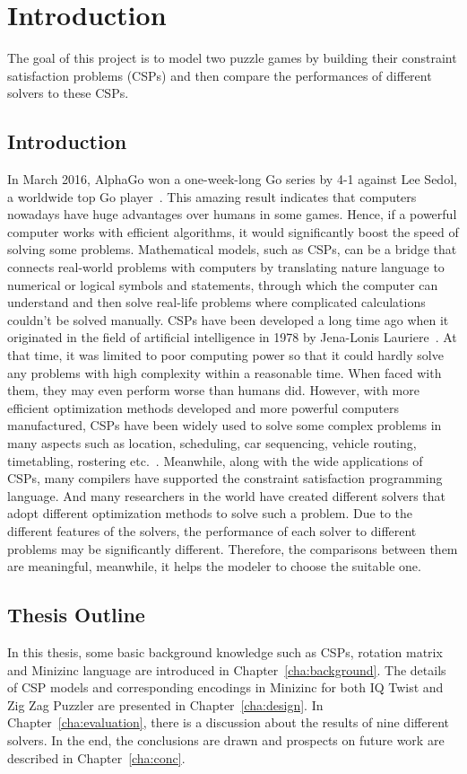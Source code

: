 \chapter{Introduction}
\label{cha:intro}
The goal of this project is to model two puzzle games by building their constraint satisfaction problems (CSPs) and then compare the performances of different solvers to these CSPs.
\section{Introduction}
\label{sec:introduction}
In March 2016, AlphaGo won a one-week-long Go series by 4-1 against Lee Sedol, a worldwide top Go player~\cite{r26}. This amazing result indicates that computers nowadays have huge advantages over humans in some games. Hence, if a powerful computer works with efficient algorithms, it would significantly boost the speed of solving some problems. Mathematical models, such as CSPs, can be a bridge that connects real-world problems with computers by translating nature language to numerical or logical symbols and statements, through which the computer can understand and then solve real-life problems where complicated calculations couldn’t be solved manually. CSPs have been developed a long time ago when it originated in the field of artificial intelligence in 1978 by Jena-Lonis Lauriere~\cite{r27}. At that time, it was limited to poor computing power so that it could hardly solve any problems with high complexity within a reasonable time. When faced with them, they may even perform worse than humans did. However, with more efficient optimization methods developed and more powerful computers manufactured, CSPs have been widely used to solve some complex problems in many aspects such as location, scheduling, car sequencing, vehicle routing, timetabling, rostering etc.~\cite{r28}. Meanwhile, along with the wide applications of CSPs, many compilers have supported the constraint satisfaction programming language. And many researchers in the world have created different solvers that adopt different optimization methods to solve such a problem. Due to the different features of the solvers, the performance of each solver to different problems may be significantly different. Therefore, the comparisons between them are meaningful, meanwhile, it helps the modeler to choose the suitable one.
\section{Thesis Outline}
\label{sec:outline}
In this thesis, some basic background knowledge such as CSPs, rotation matrix and Minizinc language are introduced in Chapter~\ref{cha:background}. The details of CSP models and corresponding encodings in Minizinc for both IQ Twist and Zig Zag Puzzler are presented in Chapter~\ref{cha:design}. In Chapter~\ref{cha:evaluation}, there is a discussion about the results of nine different solvers. In the end, the conclusions are drawn and prospects on future work are described in Chapter~\ref{cha:conc}.
